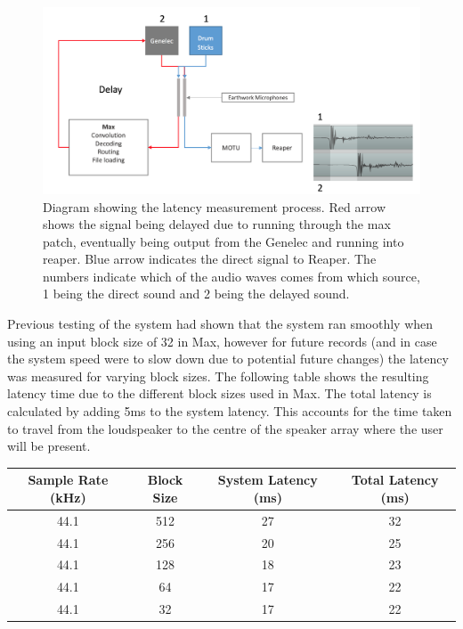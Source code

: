 \documentclass[../../main.tex]{subfiles}
\begin{document}
		\begin{figure}[H]
			\centerline{\includegraphics[scale = 0.4]{Sections/Implementation/Max/images/Latency/latencyDiagram.png}}
			\caption{Diagram showing the latency measurement process. Red arrow shows the signal being delayed due to running through the max patch, eventually being output from the Genelec and running into reaper. Blue arrow indicates the direct signal to Reaper. The numbers indicate which of the audio waves comes from which source, 1 being the direct sound and 2 being the delayed sound.}
			\label{latencyDiagram}
		\end{figure}

		Previous testing of the system had shown that the system ran smoothly when using an input block size of 32 in Max, however for future records (and in case the system speed were to slow down due to potential future changes) the latency was measured for varying block sizes. The following table shows the resulting latency time due to the different block sizes used in Max. The total latency is calculated by adding 5ms to the system latency. This accounts for the time taken to travel from the loudspeaker to the centre of the speaker array where the user will be present.


		\begin{center}
		\begin{tabular}{|c |c |c |c|}
		\hline
		Sample Rate (kHz) & Block Size & System Latency (ms) & Total Latency (ms) \\ \hline
		44.1 & 512 & 27 & 32 \\ \hline
		44.1 & 256 & 20 & 25 \\ \hline
		44.1 & 128 & 18 & 23 \\ \hline
		44.1 & 64 & 17 & 22 \\ \hline
		44.1 & 32 & 17 & 22 \\ \hline
		\end{tabular}
		\end{center}
\end{document}
